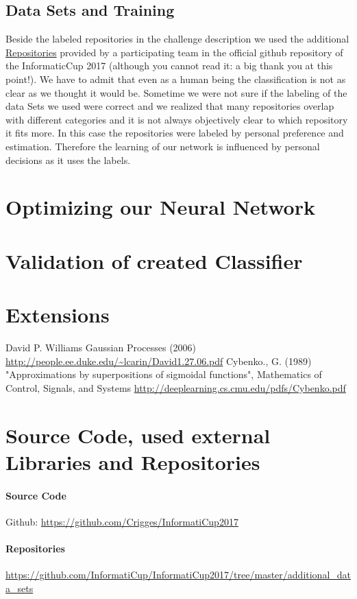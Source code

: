 \documentclass[paper=A4,pagesize=auto,12pt,headinclude=true,footinclude=true,BCOR=0mm,DIV=calc]{scrartcl}
\begin{document}
	\subsection{Data Sets and Training}
	Beside the labeled repositories in the challenge description we used the additional \hyperref[src:Repositories]{Repositories} provided by a participating team in the official github repository of the InformaticCup 2017 (although you cannot read it: a big thank you at this point!). We have to admit that even as a human being the classification is not as clear as we thought it would be. Sometime we were not sure if the labeling of the data Sets we used were correct and we realized that many repositories overlap with different categories and it is not always objectively clear to which repository it fits more. In this case the repositories were labeled by personal preference and estimation. Therefore the learning of our network is influenced by personal decisions as it uses the labels.
	\section{Optimizing our Neural Network }

	
	\section{Validation of created Classifier}
	
	\section{Extensions}
	
	
	
	\newpage
	
	\begin{thebibliography}{xxxxxx}
		 David P. Williams Gaussian Processes (2006) \url{http://people.ee.duke.edu/~lcarin/David1.27.06.pdf}
		  Cybenko., G. (1989) "Approximations by superpositions of sigmoidal functions", Mathematics of Control, Signals, and Systems \url{http://deeplearning.cs.cmu.edu/pdfs/Cybenko.pdf}
	\end{thebibliography}
	
	
	\section{Source Code, used external Libraries and Repositories}
	\paragraph{Source Code}
	Github: \url{https://github.com/Crigges/InformatiCup2017}\\
	\paragraph{Repositories}
	\label{src:Repositories}
	\url{https://github.com/InformatiCup/InformatiCup2017/tree/master/additional_data_sets}
	
\end{document}
